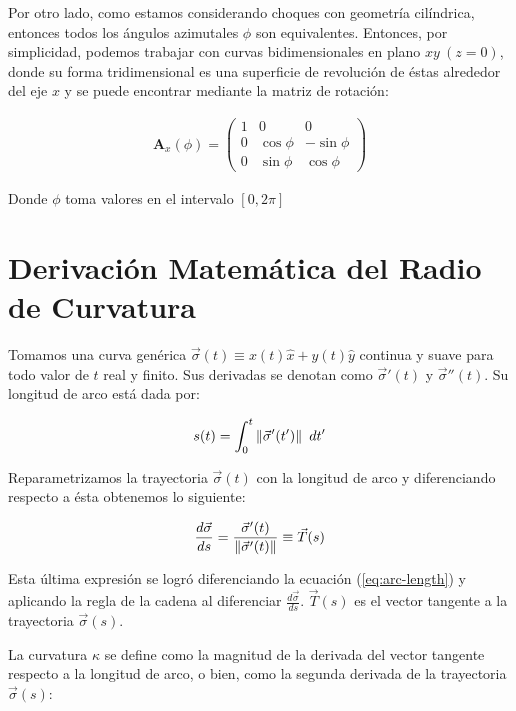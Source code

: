 Por otro lado, como estamos considerando choques con geometría cilíndrica, entonces todos los ángulos azimutales $\phi$ son equivalentes. Entonces, por simplicidad, podemos trabajar con curvas bidimensionales en plano $xy~(z=0)$, donde su forma tridimensional es una superficie de revolución de éstas alrededor del eje $x$ y se puede encontrar mediante la matriz de rotación:

\begin{align}
  \mathbf{A}_x(\phi) = \left(
  \begin{array}{ccc}
    1 & 0        & 0         \\
    0 & \cos\phi & -\sin\phi \\
    0 & \sin\phi & \cos\phi
  \end{array}
  \right)
\end{align}

Donde $\phi$ toma valores en el intervalo $[0, 2\pi]$

\chapter{Derivación Matemática del Radio de Curvatura}
\label{app:math-curvature-radius}

Tomamos una curva genérica $\vec{\sigma}(t) \equiv x(t) \hat{x} + y(t) \hat{y}$ continua y suave para todo valor de $t$ real y finito. Sus derivadas se denotan como $\vec{\sigma}'(t)$ y $\vec{\sigma}''(t)$. Su longitud de arco está dada por:

\begin{align}
  s(t) = \int^t_0 \left\lVert\vec{\sigma}'(t')\right\rVert~dt' \label{eq:arc-length}
\end{align}

Reparametrizamos la trayectoria $\vec{\sigma}(t)$ con la longitud de arco y diferenciando respecto a ésta obtenemos lo siguiente:

\begin{align}
  \frac{d\vec{\sigma}}{ds} = \frac{\vec{\sigma}'(t)}{\left\lVert\vec{\sigma}'(t)\right\rVert} \equiv \vec{T}(s)
\end{align}

Esta última expresión se logró diferenciando la ecuación (\ref{eq:arc-length}) y aplicando la regla de la cadena al diferenciar $\frac{d\vec{\sigma}}{ds}$. $\vec{T}(s)$ es el vector tangente a la trayectoria $\vec{\sigma}(s)$.

La curvatura $\kappa$ se define como la magnitud de la derivada del vector tangente respecto a la longitud de arco, o bien, como la segunda derivada de la trayectoria $\vec{\sigma}(s)$:

